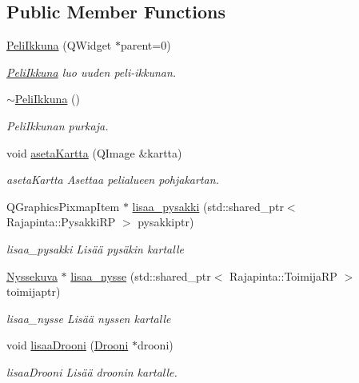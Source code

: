\subsection*{Public Member Functions}
\begin{DoxyCompactItemize}
\item 
\hyperlink{class_peli_ikkuna_af57dc5037e1bb4d6056ca9923721ec7d}{Peli\-Ikkuna} (Q\-Widget $\ast$parent=0)
\begin{DoxyCompactList}\small\item\em \hyperlink{class_peli_ikkuna}{Peli\-Ikkuna} luo uuden peli-\/ikkunan. \end{DoxyCompactList}\item 
\hyperlink{class_peli_ikkuna_a185ea9d8d778bace5f12ea619afad966}{$\sim$\-Peli\-Ikkuna} ()
\begin{DoxyCompactList}\small\item\em Peli\-Ikkunan purkaja. \end{DoxyCompactList}\item 
void \hyperlink{class_peli_ikkuna_a42e636f33ca2f6b600a9692eb96c04c0}{aseta\-Kartta} (Q\-Image \&kartta)
\begin{DoxyCompactList}\small\item\em aseta\-Kartta Asettaa pelialueen pohjakartan. \end{DoxyCompactList}\item 
Q\-Graphics\-Pixmap\-Item $\ast$ \hyperlink{class_peli_ikkuna_ace31f5abe08036d2fa3830632f857a7d}{lisaa\-\_\-pysakki} (std\-::shared\-\_\-ptr$<$ Rajapinta\-::\-Pysakki\-R\-P $>$ pysakkiptr)
\begin{DoxyCompactList}\small\item\em lisaa\-\_\-pysakki Lisää pysäkin kartalle \end{DoxyCompactList}\item 
\hyperlink{class_nyssekuva}{Nyssekuva} $\ast$ \hyperlink{class_peli_ikkuna_a3bf868fa2f549d6c3f7fde5ef1e573e0}{lisaa\-\_\-nysse} (std\-::shared\-\_\-ptr$<$ Rajapinta\-::\-Toimija\-R\-P $>$ toimijaptr)
\begin{DoxyCompactList}\small\item\em lisaa\-\_\-nysse Lisää nyssen kartalle \end{DoxyCompactList}\item 
void \hyperlink{class_peli_ikkuna_a6529cb960d0a9c6c1ac809079b6518bc}{lisaa\-Drooni} (\hyperlink{class_drooni}{Drooni} $\ast$drooni)
\begin{DoxyCompactList}\small\item\em lisaa\-Drooni Lisää droonin kartalle. \end{DoxyCompactList}\item 

\end{DoxyCompactItemize}
